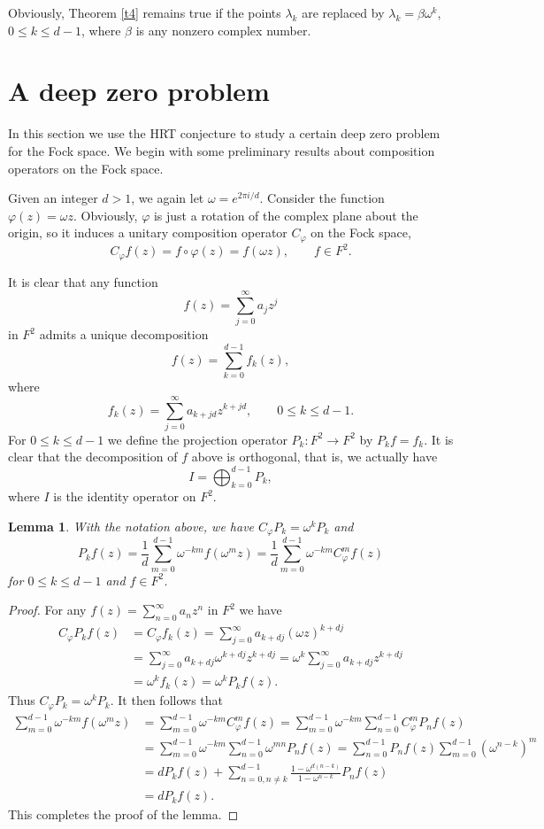 \documentclass[reqno,11pt]{amsart}
\newtheorem{lemma}[theorem]{Lemma}
\begin{document}
Obviously, Theorem \ref{t4} remains true if the points $\lambda_k$
are replaced by $\lambda_k=\beta\omega^k$, $0\le k\le d-1$, where
$\beta$ is any nonzero complex number.



\section{A deep zero problem}

In this section we use the HRT conjecture to study a certain deep
zero problem for the Fock space. We begin with some preliminary
results about composition operators on the Fock space.

Given an integer $d >1$, we  again let $\omega = e^{2\pi i/d}$.
Consider the function $\varphi(z)=\omega z$. Obviously, $\varphi$
is just a rotation of the complex plane about the origin, so it induces 
a unitary composition operator $C_{\varphi}$ on the Fock space,
$$C_{\varphi}f(z) = f\circ\varphi(z)=f(\omega z),\qquad f\in F^2.$$

It is clear that any function
$$f(z)=\sum_{j=0}^{\infty}a_{j}z^{j}$$
in $F^2$ admits a unique decomposition
$$f(z)=\sum_{k=0}^{d-1}f_{k}(z),$$
where
$$f_{k}(z)=\sum_{j=0}^{\infty}a_{k+jd}z^{k+jd},\qquad 0\le k\le d-1.$$
For $0\le k\le d-1$ we define the projection operator $P_k: F^2\to F^2$ by 
$P_{k}f=f_{k}$. It is clear that the decomposition of $f$ above is orthogonal, 
that is, we actually have
$$I=\bigoplus_{k=0}^{d-1}P_k,$$
where $I$ is the identity operator on $F^2$. 

\begin{lemma}\label{l6}
With the notation above, we have $C_{\varphi}P_k=\omega^kP_k$ and
$$P_{k}f(z)=\frac1d\sum_{m=0}^{d-1}\omega^{-km}f(\omega^mz)
=\frac1d\sum_{m=0}^{d-1}\omega^{-km}C_{\varphi}^mf(z)$$
for $0\le k\le d-1$ and $f\in F^2$.
\end{lemma}

\begin{proof}
For any $f(z)=\sum_{n=0}^\infty a_nz^n$ in $F^2$ we have
\begin{align*}
C_\varphi P_kf(z)&=C_\varphi f_k(z)
=\sum_{j=0}^\infty a_{k+dj}(\omega z)^{k+dj}\\
&=\sum_{j=0}^\infty a_{k+dj}\omega^{k+dj}z^{k+dj}
=\omega^k\sum_{j=0}^\infty a_{k+dj}z^{k+dj}\\
&=\omega^kf_k(z)=\omega^kP_kf(z).
\end{align*}
Thus $C_\varphi P_k=\omega^k P_k$. It then follows that
\begin{align*}
\sum_{m=0}^{d-1}\omega^{-km}f(\omega^mz)&=
\sum_{m=0}^{d-1}\omega^{-km}C^m_\varphi f(z)
=\sum_{m=0}^{d-1}\omega^{-km}\sum_{n=0}^{d-1}
C^m_\varphi P_nf(z)\\
&=\sum_{m=0}^{d-1}\omega^{-km}\sum_{n=0}^{d-1}
\omega^{mn}P_nf(z)
=\sum_{n=0}^{d-1}P_nf(z)\sum_{m=0}^{d-1}(\omega^{n-k})^m\\
&=dP_kf(z)+\sum_{n=0, n\not=k}^{d-1}\frac{1-\omega^{d(n-k)}}
{1-\omega^{n-k}}P_nf(z)\\
&=dP_kf(z).
\end{align*}
This completes the proof of the lemma.
\end{proof}
\end{document}
